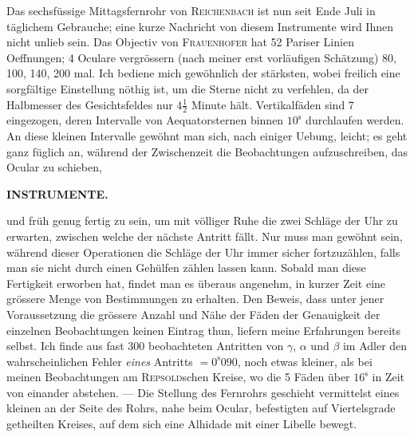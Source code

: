\par\indent Das sechsfüssige Mittagsfernrohr von \textsc{Reichenbach} ist nun seit Ende Juli in täglichem Gebrauche; eine kurze Nachricht von diesem Instrumente wird Ihnen nicht unlieb sein. Das Objectiv von \textsc{Frauenhofer}
 hat 52 Pariser Linien Oeffnungen; 4 Oculare vergrössern (nach meiner erst vorläufigen Schätzung) 80, 100, 140, 200 mal. Ich bediene mich gewöhnlich der stärksten, wobei freilich eine sorgfältige Einstellung nöthig ist, um die Sterne nicht zu verfehlen, da der Halbmesser des Gesichtsfeldes nur $4\tfrac{1}{2}$ Minute hält. Vertikalfäden sind 7 eingezogen, deren Intervalle von Aequatorsternen binnen $10^{\mathrm s}$ durchlaufen werden. An diese kleinen Intervalle gewöhnt man sich, nach einiger Uebung, leicht; es geht ganz füglich an, während der Zwischenzeit die Beobachtungen aufzuschreiben, das Ocular zu schieben, \par
{}
\thispagestyle{gaussVIGathering82}
\clearpage
\thispagestyle{empty}
\noindent{}%
%
\parbox[t]{\dimexpr\linewidth-24mm\relax}{\centering\footnotesize\bfseries INSTRUMENTE.\par}%
\makebox[12mm][r]{}\par\nobreak\medskip
\noindent und früh genug fertig zu sein, um mit völliger Ruhe die zwei Schläge der Uhr zu erwarten, zwischen
welche der nächste Antritt fällt. Nur muss man gewöhnt sein, während dieser Operationen die Schläge
der Uhr immer sicher fortzuzählen, falls man sie nicht durch einen Gehülfen zählen lassen kann. Sobald
man diese Fertigkeit erworben hat, findet man es überaus angenehm, in kurzer Zeit eine grössere
Menge von Bestimmungen zu erhalten. Den Beweis, dass unter jener Voraussetzung die grössere Anzahl und Nähe der Fäden der Genauigkeit der einzelnen Beobachtungen keinen Eintrag thun, liefern
meine Erfahrungen bereits selbst. Ich finde aus fast 300 beobachteten Antritten von $\gamma$, $\alpha$ und $\beta$ im
Adler den wahrscheinlichen Fehler \emph{eines} Antritts $= 0^{\mathrm{s}}090$, noch etwas kleiner, als bei meinen Beobachtungen am \textsc{Repsold}schen Kreise, wo die 5 Fäden über $16^{\mathrm{s}}$ in Zeit von einander abstehen. — Die Stellung des Fernrohrs geschieht vermittelst eines kleinen an der Seite des Rohrs, nahe beim Ocular, befestigten auf Viertelsgrade getheilten Kreises, auf dem sich eine Alhidade mit einer Libelle bewegt.

